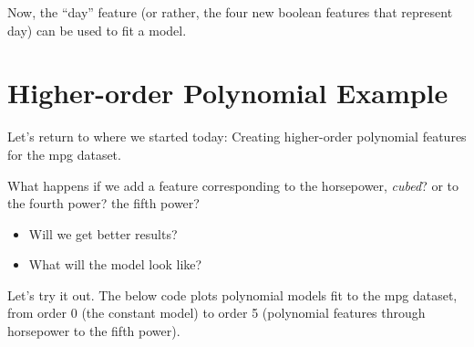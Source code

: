 \documentclass[
  letterpaper,
  DIV=11,
  numbers=noendperiod]{scrreprt}
\providecommand{\tightlist}{%
  \setlength{\itemsep}{0pt}\setlength{\parskip}{0pt}}\usepackage{longtable,booktabs,array}
\begin{document}
Now, the ``day'' feature (or rather, the four new boolean features that
represent day) can be used to fit a model.

\hypertarget{higher-order-polynomial-example}{%
\section{Higher-order Polynomial
Example}\label{higher-order-polynomial-example}}

Let's return to where we started today: Creating higher-order polynomial
features for the mpg dataset.

What happens if we add a feature corresponding to the horsepower,
\emph{cubed}? or to the fourth power? the fifth power?

\begin{itemize}
\tightlist
\item
  Will we get better results?
\item
  What will the model look like?
\end{itemize}

Let's try it out. The below code plots polynomial models fit to the mpg
dataset, from order 0 (the constant model) to order 5 (polynomial
features through horsepower to the fifth power).
\end{document}
